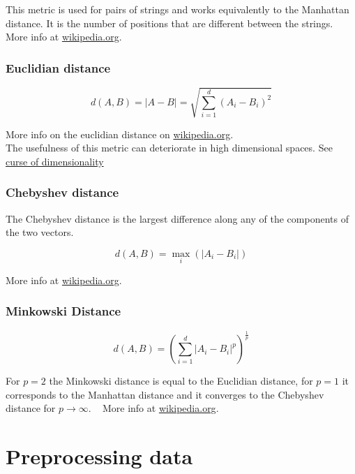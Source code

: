 \documentclass[
]{book}
\begin{document}
This metric is used for pairs of strings and works equivalently to the
Manhattan distance. It is the number of positions that are different
between the strings.\\
More info at
\href{https://en.wikipedia.org/wiki/Hamming_distance}{wikipedia.org}.

\hypertarget{euclidian-distance}{%
\subsubsection{Euclidian distance}\label{euclidian-distance}}

\[d(A, B) = | A - B | = \sqrt{\sum_{i=1}^d (A_i-B_i)^2} \]

More info on the euclidian distance on
\href{https://en.wikipedia.org/wiki/Euclidean_distance}{wikipedia.org}.\\
The usefulness of this metric can deteriorate in high dimensional
spaces. See \href{https://en.wikipedia.org/wiki/Curse_of_dimensionality\#Distance_function}{curse of
dimensionality}

\hypertarget{chebyshev-distance}{%
\subsubsection{Chebyshev distance}\label{chebyshev-distance}}

The Chebyshev distance is the largest difference along any of the
components of the two vectors.

\[d(A, B) = \max_i(|A_i-B_i|) \]

More info at
\href{https://en.wikipedia.org/wiki/Chebyshev_distance}{wikipedia.org}.

\hypertarget{minkowski-distance}{%
\subsubsection{Minkowski Distance}\label{minkowski-distance}}

\[d(A, B) = (\sum_{i=1}^d |A_i-B_i|^p)^\frac{1}{p} \]

For \(p=2\) the Minkowski distance is equal to the Euclidian distance, for
\(p=1\) it corresponds to the Manhattan distance and it converges to the
Chebyshev distance for \(p \to \infty\). ~ More info at
\href{https://en.wikipedia.org/wiki/Minkowski_distance}{wikipedia.org}.

\hypertarget{preprocessing-data}{%
\section{Preprocessing data}\label{preprocessing-data}}
\end{document}
